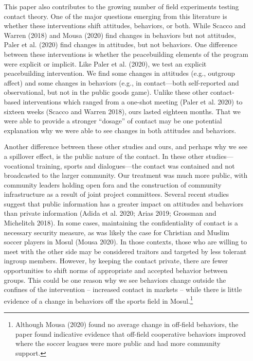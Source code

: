 \documentclass[11pt]{article}
\begin{document}
This paper also contributes to the growing number of field experiments
testing contact theory. One of the major questions emerging from this
literature is whether these interventions shift attitudes, behaviors, or
both. While Scacco and Warren (2018) and Mousa (2020) find changes in
behaviors but not attitudes, Paler et al. (2020) find changes in
attitudes, but not behaviors. One difference between these interventions
is whether the peacebuilding elements of the program were explicit or
implicit. Like Paler et al. (2020), we test an explicit peacebuilding
intervention. We find some changes in attitudes (e.g., outgroup affect)
and some changes in behaviors (e.g., in contact---both self-reported and
observational, but not in the public goods game). Unlike these other
contact-based interventions which ranged from a one-shot meeting (Paler
et al. 2020) to sixteen weeks (Scacco and Warren 2018), ours lasted
eighteen months. That we were able to provide a stronger ``dosage'' of
contact may be one potential explanation why we were able to see changes
in both attitudes and behaviors.

Another difference between these other studies and ours, and perhaps why
we see a spillover effect, is the public nature of the contact. In these
other studies---vocational training, sports and dialogues---the contact
was contained and not broadcasted to the larger community. Our treatment
was much more public, with community leaders holding open fora and the
construction of community infrastructure as a result of joint project
committees. Several recent studies suggest that public information has a
greater impact on attitudes and behaviors than private information
(Adida et al. 2020; Arias 2019; Grossman and Michelitch 2018). In some
cases, maintaining the confidentiality of contact is a necessary
security measure, as was likely the case for Christian and Muslim soccer
players in Mosul (Mousa 2020). In those contexts, those who are willing
to meet with the other side may be considered traitors and targeted by
less tolerant ingroup members. However, by keeping the contact private,
there are fewer opportunities to shift norms of appropriate and accepted
behavior between groups. This could be one reason why we see behaviors
change outside the confines of the intervention -- increased contact in
markets -- while there is little evidence of a change in behaviors off
the sports field in Mosul.\footnote{Although Mousa (2020) found no
  average change in off-field behaviors, the paper found indicative
  evidence that off-field cooperative behaviors improved where the
  soccer leagues were more public and had more community support.}
\end{document}
